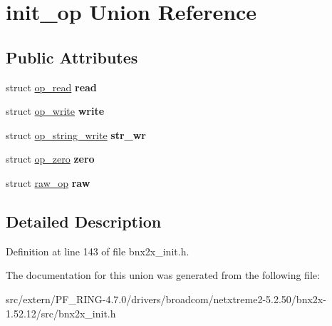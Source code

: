 \hypertarget{unioninit__op}{
\section{init\_\-op Union Reference}
\label{unioninit__op}
}
\subsection*{Public Attributes}
\begin{DoxyCompactItemize}
\item 
\hypertarget{unioninit__op_a2b2e1b426db0f92d107e956472186990}{
struct \hyperlink{structop__read}{op\_\-read} {\bfseries read}}
\label{unioninit__op_a2b2e1b426db0f92d107e956472186990}

\item 
\hypertarget{unioninit__op_adcdb260b393fa69ea92c7354a7e28537}{
struct \hyperlink{structop__write}{op\_\-write} {\bfseries write}}
\label{unioninit__op_adcdb260b393fa69ea92c7354a7e28537}

\item 
\hypertarget{unioninit__op_a0162111ccaf1396ed385617671b12ba0}{
struct \hyperlink{structop__string__write}{op\_\-string\_\-write} {\bfseries str\_\-wr}}
\label{unioninit__op_a0162111ccaf1396ed385617671b12ba0}

\item 
\hypertarget{unioninit__op_a6cbb0cbab56278ad2a63e5af6b6d6236}{
struct \hyperlink{structop__zero}{op\_\-zero} {\bfseries zero}}
\label{unioninit__op_a6cbb0cbab56278ad2a63e5af6b6d6236}

\item 
\hypertarget{unioninit__op_a74ebcd4e5647396029f2349c3c4e75b2}{
struct \hyperlink{structraw__op}{raw\_\-op} {\bfseries raw}}
\label{unioninit__op_a74ebcd4e5647396029f2349c3c4e75b2}

\end{DoxyCompactItemize}


\subsection{Detailed Description}


Definition at line 143 of file bnx2x\_\-init.h.



The documentation for this union was generated from the following file:\begin{DoxyCompactItemize}
\item 
src/extern/PF\_\-RING-\/4.7.0/drivers/broadcom/netxtreme2-\/5.2.50/bnx2x-\/1.52.12/src/bnx2x\_\-init.h\end{DoxyCompactItemize}
